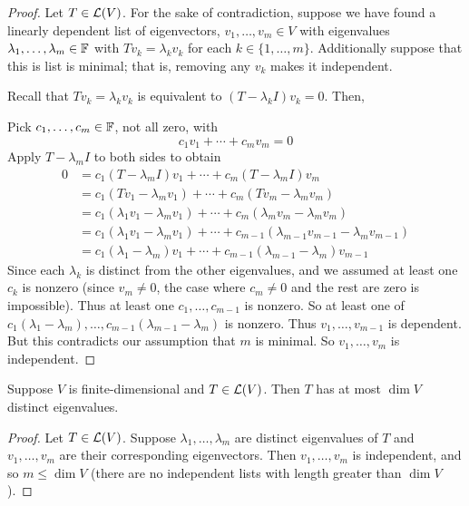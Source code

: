 \begin{proof}
    Let $T\in\mathcal{L}(V)$. For the sake of contradiction, suppose we have found a linearly dependent list of eigenvectors, $v_1, \dots, v_m \in V$ with eigenvalues $\lambda_1, \dots, \lambda_m \in \mathbb F$ with $Tv_k = \lambda_kv_k$ for each $k \in \{1, \dots, m\}$. Additionally suppose that this is list is minimal; that is, removing any $v_k$ makes it independent. 

    Recall that $Tv_k = \lambda_kv_k$ is equivalent to $(T-\lambda_kI)v_k = 0$. Then,
    
    Pick $c_1, \dots, c_m\in \mathbb F$, not all zero, with
    \[ c_1v_1 + \cdots + c_mv_m = 0\]
    Apply $T - \lambda_mI$ to both sides to obtain
    \begin{align*}
        0 &= c_1(T-\lambda_m I)v_1 + \cdots + c_m(T-\lambda_m I)v_m \\
        &= c_1(Tv_1 - \lambda_m v_1) + \cdots + c_m(Tv_m - \lambda_m v_m) \\
        &= c_1(\lambda_1v_1 - \lambda_mv_1) + \cdots + c_m(\lambda_mv_m - \lambda_mv_m) \\
        &= c_1(\lambda_1v_1 - \lambda_mv_1) + \cdots + c_{m-1}(\lambda_{m-1}v_{m-1} - \lambda_mv_{m-1}) \\
        &= c_1(\lambda_1-\lambda_m)v_1 + \cdots + c_{m-1}(\lambda_{m-1} - \lambda_m)v_{m-1}
    \end{align*}
    Since each $\lambda_k$ is distinct from the other eigenvalues, and we assumed at least one $c_k$ is nonzero (since $v_m \ne 0$, the case where $c_m \ne 0$ and the rest are zero is impossible). Thus at least one $c_1, \dots, c_{m-1}$ is nonzero. So at least one of $c_1(\lambda_1-\lambda_m), \dots, c_{m-1}(\lambda_{m-1}-\lambda_m)$ is nonzero. Thus $v_1, \dots, v_{m-1}$ is dependent. But this contradicts our assumption that $m$ is minimal. So $v_1, \dots, v_m$ is independent.
\end{proof}
\begin{theorem}
    Suppose $V$ is finite-dimensional and $T\in\mathcal{L}(V)$. Then $T$ has at most $\dim V$ distinct eigenvalues.
\end{theorem}
\begin{proof}
    Let $T\in\mathcal{L}(V)$. Suppose $\lambda_1, \dots, \lambda_m$ are distinct eigenvalues of $T$ and $v_1, \dots, v_m$ are their corresponding eigenvectors. Then $v_1, \dots, v_m$ is independent, and so $m \le \dim V$ (there are no independent lists with length greater than $\dim V$).
\end{proof}
